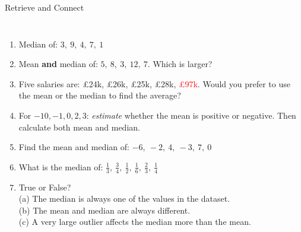\documentclass{beamer}
\newcommand{\ashow}[1]{\uncover<2->{\textcolor{red}{\small #1}}}
\newcommand{\ashowq}[1]{\alt<2->{\textcolor{red}{\small #1}}{?}}
\begin{document}
\begin{frame}{Retrieve and Connect}
\begin{columns}[T]
\footnotesize
\vspace{0.3em}
\begin{enumerate}\itemsep1pt
  \vspace{-1em}
  \item Median of: $3,\ 9,\ 4,\ 7,\ 1$ \ashow{4}
  \item Mean \textbf{and} median of: $5,\ 8,\ 3,\ 12,\ 7$. Which is larger? \ashow{equal (both $7$)}
  \item Five salaries are: £24k, £26k, £25k, £28k, \textcolor{red}{£97k}. Would you prefer to use the mean or the median to find the average? \ashow{the median}
  \item For $-10,-1,0,2,3$: \textit{estimate} whether the mean is positive or negative. Then calculate both mean and median. \ashow{negative: mean $-1.2$; median $0$}
  \item Find the mean and median of: $-6,\ -2,\ 4,\ -3,\ 7,\ 0$ \ashow{mean $0$; median $-1$}
  \item What is the median of: $\frac{1}{3},\ \frac{3}{4},\ \frac{1}{2},\ \frac{1}{6},\ \frac{2}{3},\ \frac{1}{4}$ \ashow{$\frac{5}{12}$}
  \item True or False?\\
    (a) The median is always one of the values in the dataset. \ashow{False}\\
    (b) The mean and median are always different. \ashow{False}\\
    (c) A very large outlier affects the median more than the mean. \ashow{False}

\end{enumerate}

\end{columns}
\end{frame}
\end{document}
